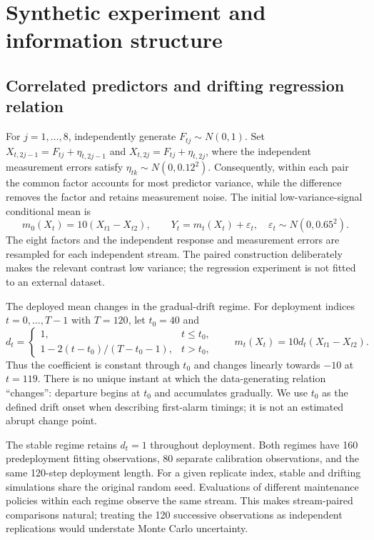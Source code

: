 \documentclass[11pt,a4paper]{article}
\begin{document}
\section{Synthetic experiment and information structure}\label{sec:dgp}
\subsection{Correlated predictors and drifting regression relation}
For $j=1,\ldots,8$, independently generate $F_{tj}\sim N(0,1)$. Set $X_{t,2j-1}=F_{tj}+\eta_{t,2j-1}$ and $X_{t,2j}=F_{tj}+\eta_{t,2j}$, where the independent measurement errors satisfy $\eta_{tk}\sim N(0,0.12^2)$. Consequently, within each pair the common factor accounts for most predictor variance, while the difference removes the factor and retains measurement noise. The initial low-variance-signal conditional mean is
\begin{equation}\label{eq:mean}
 m_0(X_t)=10(X_{t1}-X_{t2}),\qquad Y_t=m_t(X_t)+\varepsilon_t,\quad\varepsilon_t\sim N(0,0.65^2).
\end{equation}
The eight factors and the independent response and measurement errors are resampled for each independent stream. The paired construction deliberately makes the relevant contrast low variance; the regression experiment is not fitted to an external dataset.

The deployed mean changes in the gradual-drift regime. For deployment indices $t=0,\ldots,T-1$ with $T=120$, let $t_0=40$ and
\begin{equation}\label{eq:drift}
 d_t=\begin{cases}1,&t\leq t_0,\\1-2(t-t_0)/(T-t_0-1),&t>t_0,\end{cases}\qquad m_t(X_t)=10d_t(X_{t1}-X_{t2}).
\end{equation}
Thus the coefficient is constant through $t_0$ and changes linearly towards $-10$ at $t=119$. There is no unique instant at which the data-generating relation ``changes'': departure begins at $t_0$ and accumulates gradually. We use $t_0$ as the defined drift onset when describing first-alarm timings; it is not an estimated abrupt change point.

The stable regime retains $d_t=1$ throughout deployment. Both regimes have 160 predeployment fitting observations, 80 separate calibration observations, and the same 120-step deployment length. For a given replicate index, stable and drifting simulations share the original random seed. Evaluations of different maintenance policies within each regime observe the same stream. This makes stream-paired comparisons natural; treating the 120 successive observations as independent replications would understate Monte Carlo uncertainty.
\end{document}
